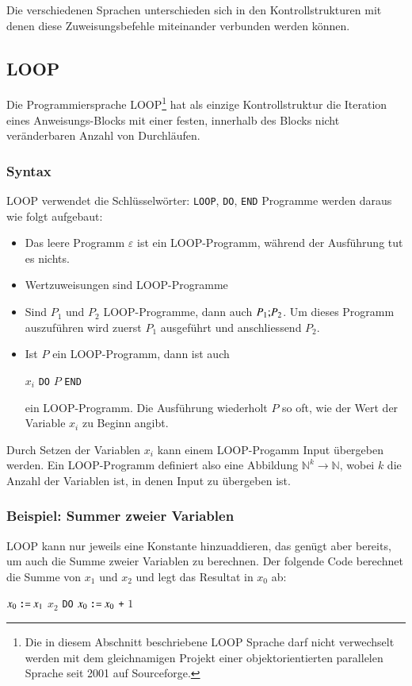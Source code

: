 Die verschiedenen Sprachen unterschieden sich in den Kontrollstrukturen
mit denen diese Zuweisungsbefehle miteinander verbunden werden können.

\subsection{LOOP}
Die Programmiersprache
LOOP\footnote{Die in diesem Abschnitt beschriebene
LOOP Sprache darf nicht verwechselt werden mit dem gleichnamigen
Projekt einer objektorientierten parallelen Sprache seit
2001 auf Sourceforge.}
hat als einzige Kontrollstruktur die
Iteration eines Anweisungs-Blocks mit einer festen, innerhalb des
Blocks nicht veränderbaren Anzahl von Durchläufen.

\subsubsection{Syntax}
LOOP verwendet die 
Schlüsselwörter: {\tt LOOP}, {\tt DO}, {\tt END}
Programme werden daraus wie folgt aufgebaut:
\begin{itemize}
\item Das leere Programm $\varepsilon$ ist ein LOOP-Programm,
während der Ausführung tut es nichts.
\item Wertzuweisungen sind LOOP-Programme
\item Sind $P_1$ und $P_2$ LOOP-Programme, dann auch
$P_1{\tt ;}P_2$. Um dieses Programm auszuführen wird zuerst $P_1$
ausgeführt und anschliessend $P_2$.
\item Ist $P$ ein LOOP-Programm, dann ist auch
\begin{algorithmic}
 $x_i$ {\tt DO} $P$ {\tt END}
\end{algorithmic}
ein LOOP-Programm. Die Ausführung wiederholt $P$ so oft, wie der
Wert der Variable $x_i$  zu Beginn angibt.
\end{itemize}
Durch Setzen der Variablen $x_i$ kann einem LOOP-Progamm Input übergeben
werden.
Ein LOOP-Programm definiert also eine Abbildung $\mathbb N^k\to\mathbb N$,
wobei $k$ die Anzahl der Variablen ist, in denen Input zu übergeben ist.

\subsubsection{Beispiel: Summer zweier Variablen}
LOOP kann nur jeweils eine Konstante hinzuaddieren, das genügt aber
bereits, um auch die Summe zweier Variablen zu berechnen. Der folgende
Code berechnet die Summe von $x_1$ und $x_2$ und legt das Resultat in
$x_0$ ab:
\begin{algorithmic}
\STATE $x_0 \mathbin{\texttt{:=}} x_1$
 $x_2$ {\tt DO}
\STATE{\tt \ \ \ \ }$x_0 \mathbin{\texttt{:=}} x_0$ {\tt +} $1$
\end{algorithmic}

